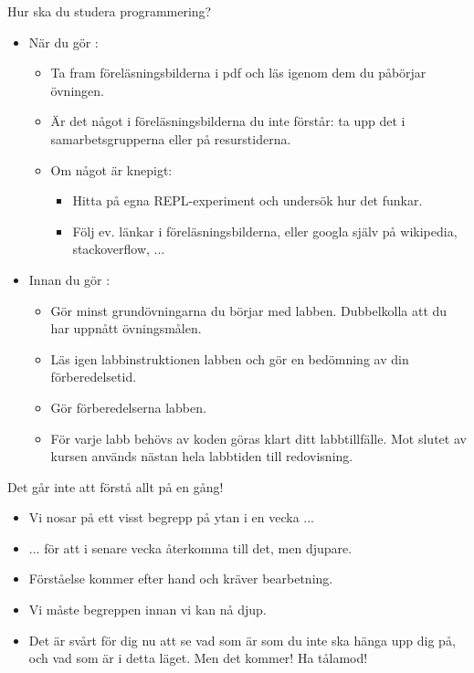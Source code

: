 \begin{SlideExtra}{Hur ska du studera programmering?}
\SlideFontSmall
  \begin{itemize}\SlideFontSmall
\item När du gör :
\begin{itemize}\SlideFontSmall
\item Ta fram föreläsningsbilderna i pdf och läs igenom dem  du påbörjar övningen.
\item Är det något i föreläsningsbilderna du inte förstår: ta upp det i samarbetsgrupperna eller på resurstiderna.
\item Om något är knepigt:
\begin{itemize}\SlideFontSmall
\item Hitta på egna REPL-experiment och undersök hur det funkar.
\item Följ ev. länkar i föreläsningsbilderna, eller googla själv på wikipedia, stackoverflow, ... 
\end{itemize}
\end{itemize}

\item Innan du gör :
\begin{itemize}\SlideFontSmall
\item Gör minst grundövningarna  du börjar med labben. Dubbelkolla att du har uppnått övningsmålen.
\item Läs igen  labbinstruktionen  labben och gör en bedömning av din förberedelsetid.
\item Gör förberedelserna  labben.
\item För varje labb behövs  av koden göras klart  ditt labbtillfälle. Mot slutet av kursen används nästan hela labbtiden till redovisning.
\end{itemize}
\end{itemize}

\end{SlideExtra}

\begin{SlideExtra}{Det går inte att förstå allt på en gång!}
\begin{itemize}
\item Vi nosar på ett visst begrepp på ytan i en vecka ...

\item ... för att i senare vecka återkomma till det, men djupare.

\item Förståelse kommer efter hand och kräver bearbetning.

\item Vi måste  begreppen innan vi kan nå djup.

\item Det är svårt för dig nu att se vad som är  som du inte ska hänga upp dig på, och vad som är  i detta läget. Men det kommer! Ha tålamod!
\end{itemize}

\end{SlideExtra}


